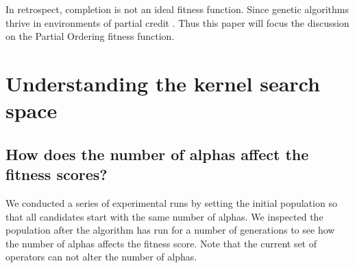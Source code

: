 \documentclass[preprint,12pt,3p]{elsarticle}
\begin{document}

In retrospect, completion is not an ideal fitness function. Since genetic algorithms thrive in environments of partial credit \cite{Eiben2003}. Thus this paper will focus the discussion on the Partial Ordering fitness function.

\section{Understanding the kernel search space}


\subsection{How does the number of alphas affect the fitness scores?}
We conducted a series of experimental runs by setting the initial population so that all candidates start with the same number of alphas. We inspected the population after the algorithm has run for a number of generations to see how the number of alphas affects the fitness score. Note that the current set of operators can not alter the number of alphas.
\end{document}
